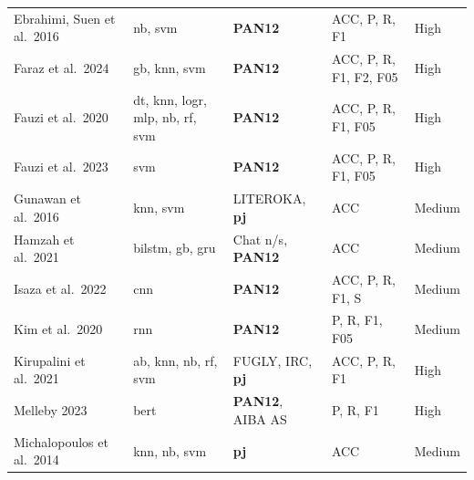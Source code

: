 \documentclass[12pt,a4paper,oneside]{report}
\begin{document}
\begin{table}[ht]
\begin{tabular}{p{3.5cm} p{4.2cm} p{3.0cm} p{2.2cm} p{1.2cm}}
Ebrahimi, Suen et al.\ 2016 & \acrshort{nb}, \acrshort{svm}                                                                     & \textbf{PAN12}                     & ACC, P, R, F1              & High   \\
Faraz et al.\ 2024          & \acrshort{gb}, \acrshort{knn}, \acrshort{svm}                                                     & \textbf{PAN12}                     & ACC, P, R, F1, F2, F05     & High   \\
Fauzi et al.\ 2020          & \acrshort{dt}, \acrshort{knn}, \acrshort{logr}, \acrshort{mlp}, \acrshort{nb}, \acrshort{rf}, \acrshort{svm} & \textbf{PAN12}           & ACC, P, R, F1, F05         & High   \\
Fauzi et al.\ 2023          & \acrshort{svm}                                                                                    & \textbf{PAN12}                     & ACC, P, R, F1, F05         & High   \\
Gunawan et al.\ 2016        & \acrshort{knn}, \acrshort{svm}                                                                    & LITEROKA, \textbf{\acrshort{pj}}   & ACC                        & Medium \\
Hamzah et al.\ 2021         & \acrshort{bilstm}, \acrshort{gb}, \acrshort{gru}                                                  & Chat n/s, \textbf{PAN12}           & ACC                        & Medium \\
Isaza et al.\ 2022          & \acrshort{cnn}                                                                                    & \textbf{PAN12}                     & ACC, P, R, F1, S           & Medium \\
Kim et al.\ 2020            & \acrshort{rnn}                                                                                    & \textbf{PAN12}                     & P, R, F1, F05              & Medium \\
Kirupalini et al.\ 2021     & \acrshort{ab}, \acrshort{knn}, \acrshort{nb}, \acrshort{rf}, \acrshort{svm}                       & FUGLY, IRC, \textbf{\acrshort{pj}} & ACC, P, R, F1              & High   \\
Melleby 2023                & \acrshort{bert}                                                                                   & \textbf{PAN12}, AIBA AS            & P, R, F1                   & High   \\
Michalopoulos et al.\ 2014  & \acrshort{knn}, \acrshort{nb}, \acrshort{svm}                                                     & \textbf{\acrshort{pj}}             & ACC                        & Medium \\

\end{tabular}
\end{table}
\end{document}
